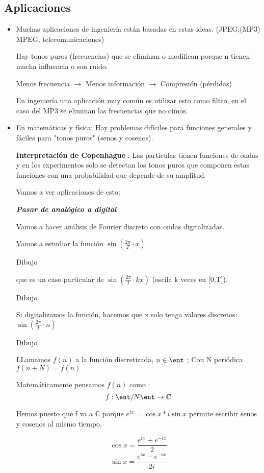 \subsection{Aplicaciones}
\begin{itemize}
	\item Muchas aplicaciones de ingeniería están basadas en estas ideas. (JPEG,(MP3) MPEG, telecomunicaciones)
	
	Hay tonos puros (frecuencias) que se eliminan o modifican porque n tienen mucha influencia o son ruido.
	
	Menos frecuencia $\rightarrow$ Menos información $\rightarrow$ Compresión (pérdidas)
	
	En ingeniería una aplicación muy común es utilizar esto como filtro, en el caso del MP3 se eliminan las frecuencias que no oimos.
	
	\item En matemáticas y física: Hay problemas difíciles para funciones generales y fáciles para "tonos puros" (senos y cosenos).
	
		\textbf{Interpretación de Copenhague} : Las partículas tienen funciones de ondas y en los experimentos solo se detectan los tonos puros que componen estas funciones con una probabilidad que depende de su amplitud.
		
	Vamos a ver aplicaciones de esto:
	
	\textbf{\textit{Pasar de analógico a digital}}
	
	Vamos a hacer análisis de Fourier discreto con ondas digitalizadas.
	
	\begin{example}
		Vamos a estudiar la función $\sin(\frac{2\pi}{T}\cdot x)$
		
		Dibujo
		
		que es un caso particular de $\sin(\frac{2\pi}{T}\cdot k x)$ (oscila k veces en [0,T]).
		
		Dibujo
		
		Si digitalizamos la función, hacemos que x solo tenga valores discretos: $\sin(\frac{2\pi}{T}\cdot n)$
		
		Dibujo
		
		LLamamos $f(n)$ a la función discretizada, $n \in \ent$ ; Con N periódica $f(n + N) = f(n)$
		
		Matemáticamente pensamos $f(n)$ como :
		$$f : \ent/N\ent \rightarrow \mathbb{C} $$
	\end{example} 
	\obs Hemos puesto que f va a $\mathbb{C}$ porque $e^{ix} = \cos x * i\sin x$ permite escribir senos y cosenos al mismo tiempo.
	
	$$\cos x = \frac{e^{ix} + e^{-ix}}{2}$$
	$$\sin x = \frac{e^{ix} - e^{-ix}}{2i}$$
	
\end{itemize}


